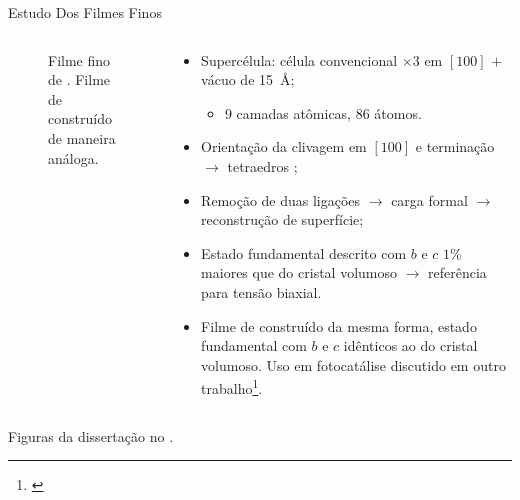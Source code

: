 \begin{frame}{Estudo Dos Filmes Finos}
	\begin{columns}
		\begin{column}{.5\textwidth}
			\begin{figure}[t]
				\centering
				
				\caption{Filme fino de . Filme de  construído de maneira análoga.\label{fig:slabs}}
			\end{figure}
		\end{column}
		\begin{column}{.5\textwidth}
			\begin{itemize}
				\item Supercélula: célula convencional $\times 3$ em $[100]$ $+$ vácuo de \SI{15}{\angstrom};
				\begin{itemize}
					\item 9 camadas atômicas, 86 átomos.
				\end{itemize}
				\item Orientação da clivagem em $[100]$ e terminação  $\to$ tetraedros ;
				\item Remoção de duas ligações  $\to$ carga formal $\to$ reconstrução de superfície;
				\item Estado fundamental descrito com \alert{$b$ e $c$ $1\%$ maiores que do cristal volumoso} $\to$ referência para tensão biaxial.
				\item Filme de  construído da mesma forma, estado fundamental com $b$ e $c$ idênticos ao do cristal volumoso. Uso em fotocatálise discutido em outro trabalho\footnote[frame]{\cite{kraus_modulation_2020}}.
			\end{itemize}
		\end{column}
	\end{columns}
	\begin{center}
		Figuras da dissertação no \href{https://github.com/o-aleoli/nma_dissertation_fig}{\color{blue}{repositório do GitHub}}.
	\end{center}
\end{frame}
